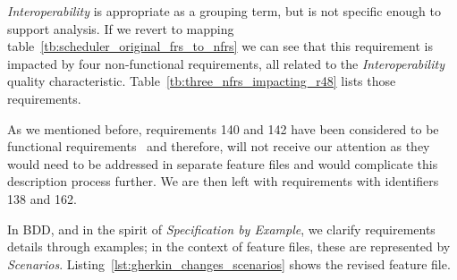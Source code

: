 \documentclass[dissertation,final]{softeng}
\newcommand{\nfrs}{non-functional requirements\xspace}
\begin{document}
\emph{Interoperability} is appropriate as a grouping term, but is not specific enough to support analysis. If we revert to mapping table~\ref{tb:scheduler_original_frs_to_nfrs} we can see that this requirement is impacted by four \nfrs, all related to the \emph{Interoperability} quality characteristic. Table~\ref{tb:three_nfrs_impacting_r48} lists those requirements.

\captionsetup[table]{list=no}
\begin{table}[h!]
\caption{Four \nfrs impacting functional requirement 48}
\label{tb:three_nfrs_impacting_r48}
\setlength{\extrarowheight}{1.8pt}
\centering
{}
\end{table}
\captionsetup[table]{list=yes}

As we mentioned before, requirements 140 and 142 have been considered to be functional requirements~\citep{MylopoulosOnt2014} and therefore, will not receive our attention as they would need to be addressed in separate feature files and would complicate this description process further. We are then left with requirements with identifiers 138 and 162.

In BDD, and in the spirit of \emph{Specification by Example}, we clarify requirements details through examples; in the context of feature files, these are represented by \emph{Scenarios}. Listing~\ref{lst:gherkin_changes_scenarios} shows the revised feature file.
\end{document}
